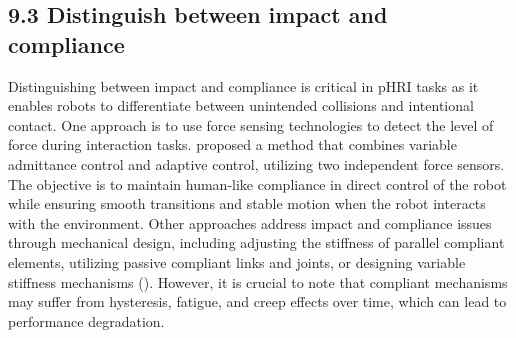 \subsection{9.3 Distinguish between impact and compliance}

Distinguishing between impact and compliance is critical in pHRI tasks as it enables robots to differentiate between unintended collisions and intentional contact. One approach is to use force sensing technologies to detect the level of force during interaction tasks. \cite{li2018stable} proposed a method that combines variable admittance control and adaptive control, utilizing two independent force sensors. The objective is to maintain human-like compliance in direct control of the robot while ensuring smooth transitions and stable motion when the robot interacts with the environment. Other approaches address impact and compliance issues through mechanical design, including adjusting the stiffness of parallel compliant elements, utilizing passive compliant links and joints, or designing variable stiffness mechanisms (\cite{niehues2015compliance,she2020comparative,ayoubi2020safe}). However, it is crucial to note that compliant mechanisms may suffer from hysteresis, fatigue, and creep effects over time, which can lead to performance degradation.




